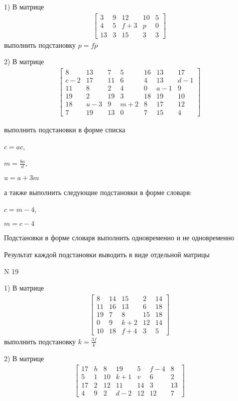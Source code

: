 \documentclass[11pt]{report}
\begin{document}
    1) В матрице
\begin{align*}
\left[\begin{matrix}3 & 9 & 12 & 10 & 5\\4 & 5 & f + 3 & p & 0\\13 & 3 & 15 & 3 & 3\end{matrix}\right]
\end{align*}
выполнить подстановку $p=f p$


    2) В матрице
\begin{align*}
\left[\begin{matrix}8 & 13 & 7 & 5 & 16 & 13 & 17\\c - 2 & 17 & 11 & 6 & 4 & 13 & d - 1\\11 & 8 & 2 & 4 & 0 & a - 1 & 9\\19 & 2 & 19 & 3 & 18 & 19 & 10\\18 & u - 3 & 9 & m + 2 & 8 & 17 & 12\\7 & 19 & 13 & 0 & 7 & 15 & 4\end{matrix}\right]
\end{align*}

выполнить подстановки в форме списка

$c=a c$,

$m=\frac{8 a}{d}$,

$u=a + 3 m$

а также выполнить следующие подстановки в форме словаря:

$c=m - 4$,

$m=c - 4$


    Подстановки в форме словаря выполнить одновременно и не одновременно


    Результат каждой подстановки выводить в виде отдельной матрицы

\newpage
N 19


    1) В матрице
\begin{align*}
\left[\begin{matrix}8 & 14 & 15 & 2 & 14\\11 & 16 & 13 & 6 & 18\\19 & 7 & 8 & 15 & 18\\0 & 9 & k + 2 & 12 & 14\\10 & 18 & f + 4 & 3 & 5\end{matrix}\right]
\end{align*}
выполнить подстановку $k=\frac{3 f}{k}$


    2) В матрице
\begin{align*}
\left[\begin{matrix}17 & h & 8 & 19 & 5 & f - 4 & 8\\5 & 1 & 10 & k + 1 & v & 6 & 2\\17 & 2 & 12 & 11 & 14 & 3 & 13\\4 & 9 & 2 & d - 2 & 12 & 12 & 7\end{matrix}\right]
\end{align*}
\end{document}
